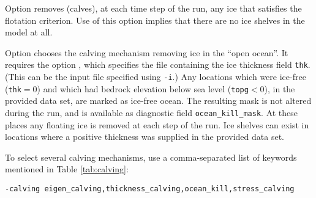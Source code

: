 Option  removes (calves), at each time step of the run, any ice that satisfies the flotation criterion.  Use of this option implies that there are no ice shelves in the model at all.

Option  chooses the calving mechanism removing ice in the ``open ocean''. It requires the option , which specifies the file containing the ice thickness field \texttt{thk}. (This can be the input file specified using \texttt{-i}.) Any locations which were ice-free (\texttt{thk}$=0$) and which had bedrock elevation below sea level (\texttt{topg}$<0$), in the provided data set, are marked as ice-free ocean.  The resulting mask is not altered during the run, and is available as diagnostic field \texttt{ocean_kill_mask}.  At these places any floating ice is removed at each step of the run.  Ice shelves can exist in locations where a positive thickness was supplied in the provided data set.

To select several calving mechanisms, use a comma-separated list of keywords mentioned in Table \ref{tab:calving}:
\begin{verbatim}
-calving eigen_calving,thickness_calving,ocean_kill,stress_calving
\end{verbatim}

